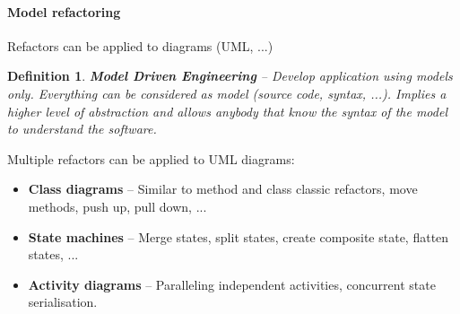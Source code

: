 \documentclass[a4paper,11pt]{report}
\newtheorem{definition}{Definition}
\begin{document}
		\paragraph{Model refactoring}
			Refactors can be applied to diagrams (UML, ...)
			\begin{definition}
				\textbf{Model Driven Engineering} --
					Develop application using models
					only. Everything can be considered
					as model (source code, syntax, ...).
					Implies a higher level of abstraction
					and allows anybody that know the
					syntax of the model to understand 
					the software.					
			\end{definition}\noindent
			Multiple refactors can be applied to UML
				diagrams:
			\begin{itemize}
				\setlength{\itemsep}{0pt}
				\setlength{\parskip}{0pt}
				\setlength{\parsep}{0pt}
				\item \textbf{Class diagrams} -- 
					Similar to method and class
					classic refactors, move methods,
					push up, pull down, ...
				\item \textbf{State machines} -- 
					Merge states, split states,
					create composite state,
					flatten states, ...
				\item \textbf{Activity diagrams} --
					Paralleling independent activities,
					concurrent state serialisation.
			\end{itemize}
%
\end{document}
